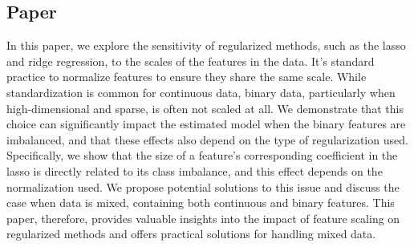 \subsection{Paper \VI}

In this paper, we explore the sensitivity of regularized methods, such as the lasso and ridge regression, to the scales of the features in the data. It's standard practice to normalize features to ensure they share the same scale. While standardization is common for continuous data, binary data, particularly when high-dimensional and sparse, is often not scaled at all. We demonstrate that this choice can significantly impact the estimated model when the binary features are imbalanced, and that these effects also depend on the type of regularization used. Specifically, we show that the size of a feature's corresponding coefficient in the lasso is directly related to its class imbalance, and this effect depends on the normalization used. We propose potential solutions to this issue and discuss the case when data is mixed, containing both continuous and binary features. This paper, therefore, provides valuable insights into the impact of feature scaling on regularized methods and offers practical solutions for handling mixed data.
